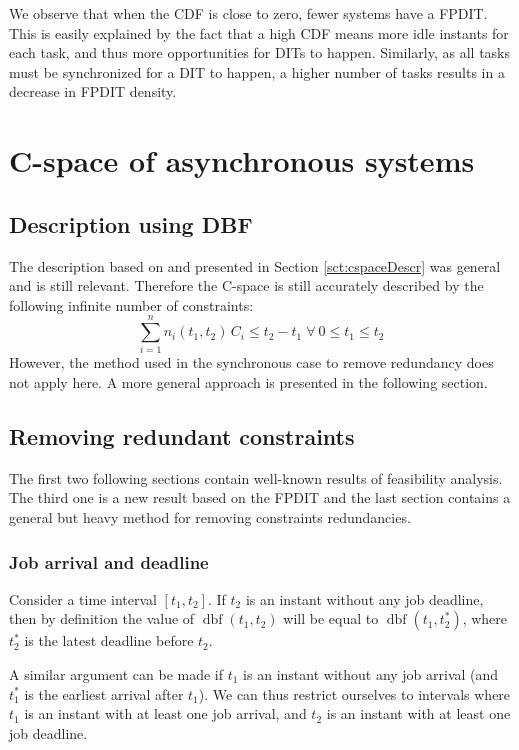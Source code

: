 \documentclass[conference]{IEEEtran}
\newcommand{\dbf}[1]{\operatorname{dbf}(#1)}
\begin{document}
	We observe that when the CDF is close to zero, fewer systems have a FPDIT.
	This is easily explained by the fact that
	a high CDF means more idle instants for each task, and thus more opportunities
	for DITs to happen. Similarly, as all tasks must be synchronized for a DIT to
	happen, a higher number of tasks results in a decrease in FPDIT density.

\section{C-space of asynchronous systems}
\label{sct:asyncCspace}

	\subsection{Description using DBF}

		The description based on \cite{baruah1999generalized} and presented in Section \ref{sct:cspaceDescr} was general and
		is still relevant. Therefore the C-space is still accurately described by
		the following infinite number of constraints:
		\begin{equation}
			\sum_{i=1}^{n} n_i(t_1, t_2)
			\, C_i \leq t_2 - t_1 \; \forall \: 0 \leq t_1 \leq t_2
		\end{equation}
		However, the method used in the synchronous case to remove redundancy does not
		apply here. A more general approach is presented in the following section.

	\subsection{Removing redundant constraints}

		The first two following sections contain well-known results of feasibility analysis.
		The third one is a new result based on the FPDIT and the last section contains a general
		but heavy method for removing constraints redundancies.

		\subsubsection{Job arrival and deadline}
			Consider a time interval $[t_1, t_2]$. If $t_2$ is an instant without any
			job deadline, then by definition the value of $\dbf{t_1, t_2}$ will be equal to
			$\dbf{t_1, t_2^*}$, where $t_2^*$ is the latest deadline before $t_2$.

			A similar argument can be made if $t_1$ is an instant without any job arrival
			(and $t_1^*$ is the earliest arrival after $t_1$). We can thus restrict
			ourselves to intervals where $t_1$ is an instant with at least one job
			arrival, and $t_2$ is an instant with at least one job deadline.
\end{document}
